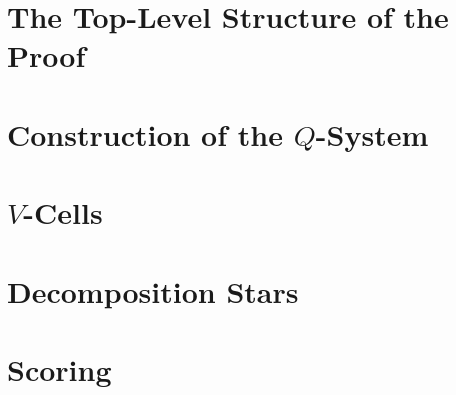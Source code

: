 \chapter{The Top-Level Structure of the Proof}
    \chapter{Construction of the $Q$-System}
    \chapter{$V$-Cells}
    \chapter{Decomposition Stars}
    \chapter{Scoring}


